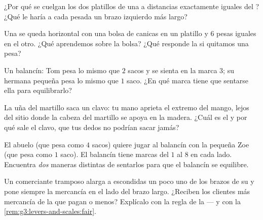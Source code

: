 \begin{exercise}[$\star$]\label{exo:g3:levers-and-scales:6}
¿Por qué se cuelgan los dos platillos de una  a distancias
exactamente iguales del ? ¿Qué le haría a cada pesada
un brazo izquierdo más largo?
\end{exercise}

\begin{exercise}[$\star$]\label{exo:g3:levers-and-scales:7}
Una  se queda horizontal con una bolsa de canicas en un
platillo y $6$ pesas iguales en el otro. ¿Qué aprendemos sobre la
bolsa? ¿Qué responde la  si quitamos una pesa?
\end{exercise}

\begin{exercise}[$\star$]\label{exo:g3:levers-and-scales:8}
Un balancín: Tom pesa lo mismo que $2$ sacos y se sienta en la marca
$3$; su hermana pequeña pesa lo mismo que $1$ saco. ¿En qué marca
tiene que sentarse ella para equilibrarlo?
\end{exercise}

\begin{exercise}[$\star$]\label{exo:g3:levers-and-scales:9}
La uña del martillo saca un clavo: tu mano aprieta el extremo del
mango, lejos del sitio donde la cabeza del martillo se apoya en la
madera. ¿Cuál es el  y por qué sale el clavo, que tus
dedos no podrían sacar jamás?
\end{exercise}

\begin{exercise}[$\star\star$]\label{exo:g3:levers-and-scales:10}
El abuelo (que pesa como $4$ sacos) quiere jugar al balancín con la
pequeña Zoe (que pesa como $1$ saco). El balancín tiene marcas del $1$
al $8$ en cada lado. Encuentra \emph{dos} maneras distintas de
sentarlos para que el balancín se equilibre.
\end{exercise}

\begin{exercise}[$\star\star$]\label{exo:g3:levers-and-scales:11}
Un comerciante tramposo alarga a escondidas un poco uno de los brazos
de su  y pone siempre la mercancía en el lado del brazo largo.
¿Reciben los clientes más mercancía de la que pagan o menos?
Explícalo con la regla de la  --- y con la
\cref{rem:g3:levers-and-scales:fair}.
\end{exercise}
